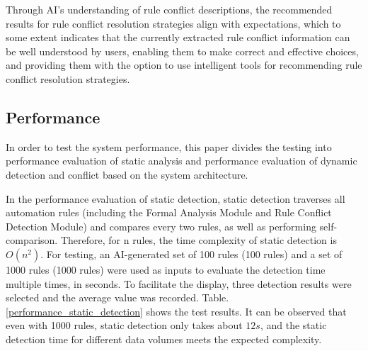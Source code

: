 Through AI's understanding of rule conflict descriptions, the recommended results for rule conflict resolution strategies align with expectations, which to some extent indicates that the currently extracted rule conflict information can be well understood by users, enabling them to make correct and effective choices, and providing them with the option to use intelligent tools for recommending rule conflict resolution strategies.

\subsection{Performance} 
In order to test the system performance, this paper divides the testing into performance evaluation of static analysis and performance evaluation of dynamic detection and conflict based on the system architecture.

In the performance evaluation of static detection, static detection traverses all automation rules (including the Formal Analysis Module and Rule Conflict Detection Module) and compares every two rules, as well as performing self-comparison. Therefore, for n rules, the time complexity of static detection is $O\left(n^2\right)$. For testing, an AI-generated set of 100 rules (100 rules) and a set of 1000 rules (1000 rules) were used as inputs to evaluate the detection time multiple times, in seconds. To facilitate the display, three detection results were selected and the average value was recorded. Table.\ref{performance_static_detection} shows the test results. It can be observed that even with 1000 rules, static detection only takes about $12s$, and the static detection time for different data volumes meets the expected complexity.

